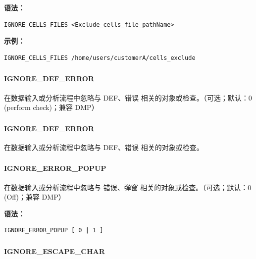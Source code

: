 \textbf{语法：}
\begin{lstlisting}
IGNORE_CELLS_FILES <Exclude_cells_file_pathName>
\end{lstlisting}

\textbf{示例：}
\begin{lstlisting}
IGNORE_CELLS_FILES /home/users/customerA/cells_exclude
\end{lstlisting}

\subsubsection{}
\paragraph*{IGNORE_DEF_ERROR}

在数据输入或分析流程中忽略与 DEF、错误 相关的对象或检查。（可选；默认：0 (perform check)；兼容 DMP）

\subsubsection{}
\paragraph*{IGNORE_DEF_ERROR}

在数据输入或分析流程中忽略与 DEF、错误 相关的对象或检查。

\subsubsection{}
\paragraph*{IGNORE_ERROR_POPUP}

在数据输入或分析流程中忽略与 错误、弹窗 相关的对象或检查。（可选；默认：0 (Off)；兼容 DMP）

\textbf{语法：}
\begin{lstlisting}
IGNORE_ERROR_POPUP [ 0 | 1 ]
\end{lstlisting}

\subsubsection{}
\paragraph*{IGNORE_ESCAPE_CHAR}

